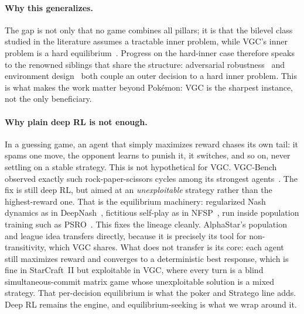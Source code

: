 \paragraph{Why this generalizes.}
The gap is not only that no game combines all pillars; it is that the bilevel class
studied in the literature assumes a tractable inner problem, while VGC's inner
problem is a hard equilibrium~\cite{zhang2023bilevel}. Progress on the hard-inner
case therefore speaks to the renowned siblings that share the structure:
adversarial robustness~\cite{madry2018towards} and environment
design~\cite{dennis2020emergent} both couple an outer decision to a hard inner
problem. This is what makes the work matter beyond Pok\'{e}mon: VGC is the
sharpest instance, not the only beneficiary.
\paragraph{Why plain deep RL is not enough.}
In a guessing game, an agent that simply maximizes reward chases its own tail: it
spams one move, the opponent learns to punish it, it switches, and so on, never
settling on a stable strategy. This is not hypothetical for VGC. VGC-Bench observed
exactly such rock-paper-scissors cycles among its strongest
agents~\cite{angliss2026vgcbench}. The fix is still deep RL, but aimed at an
\emph{unexploitable} strategy rather than the highest-reward one. That is the
equilibrium machinery: regularized Nash dynamics as in
DeepNash~\cite{perolat2022deepnash}, fictitious self-play as in
NFSP~\cite{heinrich2016nfsp}, run inside population training such as
PSRO~\cite{lanctot2017psro}. This fixes the lineage cleanly. AlphaStar's
population and league idea transfers directly, because it is precisely its tool
for non-transitivity, which VGC shares. What does not transfer is its core: each
agent still maximizes reward and converges to a deterministic best response, which
is fine in StarCraft~II but exploitable in VGC, where every turn is a blind
simultaneous-commit matrix game whose unexploitable solution is a mixed strategy.
That per-decision equilibrium is what the poker and Stratego line adds. Deep RL
remains the engine, and equilibrium-seeking is what we wrap around it.

